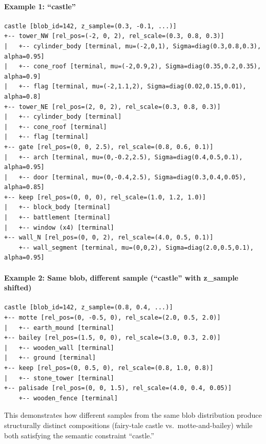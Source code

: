 \documentclass[11pt]{article}
\begin{document}
\paragraph{Example 1: ``castle''}

\begin{lstlisting}
castle [blob_id=142, z_sample=(0.3, -0.1, ...)]
+-- tower_NW [rel_pos=(-2, 0, 2), rel_scale=(0.3, 0.8, 0.3)]
|   +-- cylinder_body [terminal, mu=(-2,0,1), Sigma=diag(0.3,0.8,0.3), alpha=0.95]
|   +-- cone_roof [terminal, mu=(-2,0.9,2), Sigma=diag(0.35,0.2,0.35), alpha=0.9]
|   +-- flag [terminal, mu=(-2,1.1,2), Sigma=diag(0.02,0.15,0.01), alpha=0.8]
+-- tower_NE [rel_pos=(2, 0, 2), rel_scale=(0.3, 0.8, 0.3)]
|   +-- cylinder_body [terminal]
|   +-- cone_roof [terminal]
|   +-- flag [terminal]
+-- gate [rel_pos=(0, 0, 2.5), rel_scale=(0.8, 0.6, 0.1)]
|   +-- arch [terminal, mu=(0,-0.2,2.5), Sigma=diag(0.4,0.5,0.1), alpha=0.95]
|   +-- door [terminal, mu=(0,-0.4,2.5), Sigma=diag(0.3,0.4,0.05), alpha=0.85]
+-- keep [rel_pos=(0, 0, 0), rel_scale=(1.0, 1.2, 1.0)]
|   +-- block_body [terminal]
|   +-- battlement [terminal]
|   +-- window (x4) [terminal]
+-- wall_N [rel_pos=(0, 0, 2), rel_scale=(4.0, 0.5, 0.1)]
    +-- wall_segment [terminal, mu=(0,0,2), Sigma=diag(2.0,0.5,0.1), alpha=0.95]
\end{lstlisting}

\paragraph{Example 2: Same blob, different sample (``castle'' with z\_sample shifted)}

\begin{lstlisting}
castle [blob_id=142, z_sample=(0.8, 0.4, ...)]
+-- motte [rel_pos=(0, -0.5, 0), rel_scale=(2.0, 0.5, 2.0)]
|   +-- earth_mound [terminal]
+-- bailey [rel_pos=(1.5, 0, 0), rel_scale=(3.0, 0.3, 2.0)]
|   +-- wooden_wall [terminal]
|   +-- ground [terminal]
+-- keep [rel_pos=(0, 0.5, 0), rel_scale=(0.8, 1.0, 0.8)]
|   +-- stone_tower [terminal]
+-- palisade [rel_pos=(0, 0, 1.5), rel_scale=(4.0, 0.4, 0.05)]
    +-- wooden_fence [terminal]
\end{lstlisting}

This demonstrates how different samples from the same blob distribution produce structurally distinct compositions (fairy-tale castle vs.\ motte-and-bailey) while both satisfying the semantic constraint ``castle.''
\end{document}
